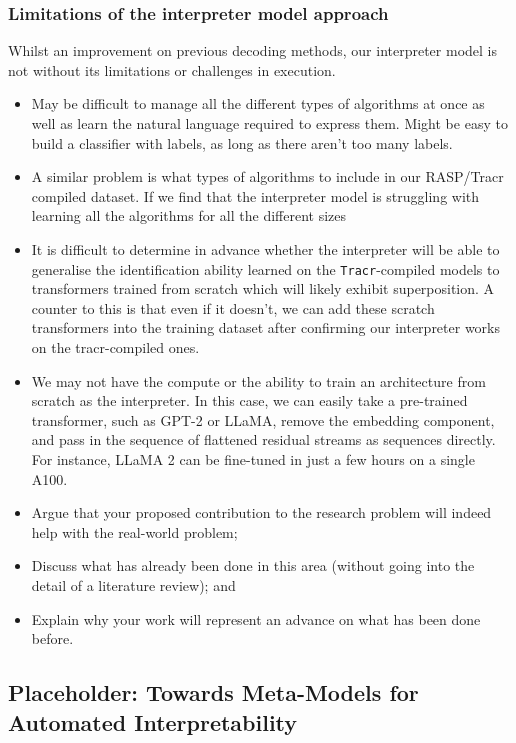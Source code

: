 \documentclass[11pt]{scrartcl}
\begin{document}
\subsubsection{Limitations of the interpreter model approach}

Whilst an improvement on previous decoding methods, our interpreter model is not without its limitations or challenges in execution.
\begin{itemize}
\item May be difficult to manage all the different types of algorithms at once as well as learn the natural language required to express them. Might be easy to build a classifier with labels, as long as there aren't too many labels. 
\item A similar problem is what types of algorithms to include in our RASP/Tracr compiled dataset. If we find that the interpreter model is struggling with learning all the algorithms for all the different sizes 
\item It is difficult to determine in advance whether the interpreter will be able to generalise the identification ability learned on the \texttt{Tracr}-compiled models to transformers trained from scratch which will likely exhibit superposition. A counter to this is that even if it doesn't, we can add these scratch transformers into the training dataset after confirming our interpreter works on the tracr-compiled ones.
\item We may not have the compute or the ability to train an architecture from scratch as the interpreter. In this case, we can easily take a pre-trained transformer, such as GPT-2 or LLaMA, remove the embedding component, and pass in the sequence of flattened residual streams as sequences directly. For instance, LLaMA 2 can be fine-tuned in just a few hours on a single A100.
\end{itemize}

\color{blue}
\begin{itemize}
\item Argue that your proposed contribution to the research problem will indeed
help with the real-world problem;
\item Discuss what has already been done in this area (without going into the detail of a literature review); and
\item Explain why your work will represent an advance on what has been done
before.
\end{itemize}
\color{black}

\subsection{Placeholder: Towards Meta-Models for Automated Interpretability}
\end{document}
